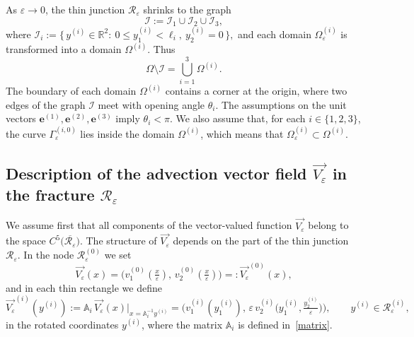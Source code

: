\documentclass[reqno]{amsart}            %
\numberwithin{equation}{section}
\begin{document}
	As $\varepsilon\to0$, the thin junction $\mathcal{R}_\varepsilon$ shrinks to
	the graph
	\begin{equation}\label{graph}
		\mathcal{I}:=\mathcal{I}_1\cup\mathcal{I}_2\cup\mathcal{I}_3,
	\end{equation}
	where
	$\mathcal{I}_i :=\{\,y^{(i)}\in\mathbb{R}^2:\ 0\le y_1^{(i)}<\ell_i,\ y_2^{(i)}=0\,\},$ and each domain $\Omega_\varepsilon^{(i)}$ is transformed into a domain
	$\Omega^{(i)}$. Thus
	\begin{equation}\label{limit-domain}
		\Omega\setminus\mathcal{I}=\bigcup_{i=1}^{3}\Omega^{(i)}.
	\end{equation}
	The boundary of each domain $\Omega^{(i)}$ contains a corner at the origin,
	where two edges of the graph $\mathcal{I}$ meet with opening angle $\theta_i$.
	The assumptions on the unit vectors $\mathbf{e}^{(1)},\mathbf{e}^{(2)},\mathbf{e}^{(3)}$
	imply $\theta_i<\pi$. We also assume that, for each $i\in\{1,2,3\}$, the curve
	$\Gamma_\varepsilon^{(i,0)}$ lies inside the domain $\Omega^{(i)}$, which means
	that $\Omega_\varepsilon^{(i)}\subset\Omega^{(i)}$.
	
	
	
	\subsection{Description of the advection vector field $\overrightarrow{V_\varepsilon}$ in the fracture  $\mathcal{R}_\varepsilon$}\label{convextion-flux}
	
	We assume first that all components of the vector-valued function
	$\overrightarrow{V_\varepsilon}$ belong to the space
	$C^{5}\big(\overline{\mathcal{R}_\varepsilon}\big)$.
	The structure of $\overrightarrow{V_\varepsilon}$ depends on the part of the
	thin junction $\mathcal{R}_\varepsilon$. In the node $\mathcal{R}_\varepsilon^{(0)}$ we set
	\[
	\overrightarrow{V_\varepsilon}(x)
	=\big(v^{(0)}_1(\tfrac{x}{\varepsilon}),\,
	v^{(0)}_2(\tfrac{x}{\varepsilon})\big)
	=: \overrightarrow{V_\varepsilon}^{(0)}(x),
	\]
	and in each thin rectangle we define
	\begin{equation}\label{conv-1}
		\overrightarrow{V_\varepsilon}^{(i)}(y^{(i)})
		:=\mathbb{A}_i\,\overrightarrow{V_\varepsilon}(x)\big|_{x=\mathbb{A}_i^{-1}y^{(i)}}
		=\Big(v^{(i)}_1(y_1^{(i)}),\,
		\varepsilon\,v^{(i)}_2\big(y_1^{(i)},\tfrac{y_2^{(i)}}{\varepsilon}\big)\Big),
		\qquad y^{(i)}\in\mathcal{R}_\varepsilon^{(i)},
	\end{equation}
	in the rotated coordinates $y^{(i)}$, where the matrix $\mathbb{A}_i$ is defined in~\eqref{matrix}.
	
\end{document}

